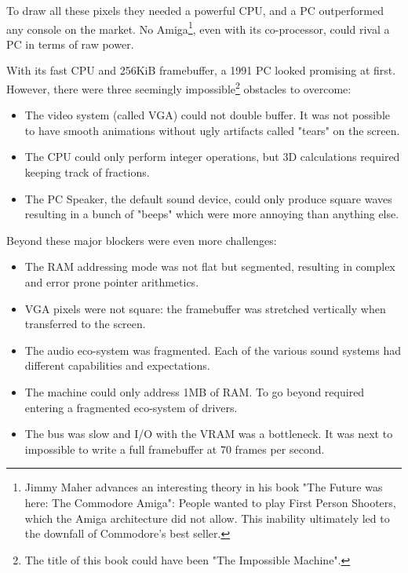 \par
To draw all these pixels they needed a powerful CPU, and a PC outperformed any console on the market. No Amiga\footnote{Jimmy Maher advances an interesting theory in his book "The Future was here: The Commodore Amiga": People wanted to play First Person Shooters, which the Amiga architecture did not allow. This inability ultimately led to the downfall of Commodore's best seller.}, even with its co-processor, could rival a PC in terms of raw power.
\par


 
With its fast CPU and 256KiB framebuffer, a 1991 PC looked promising at first. However, there were three seemingly impossible\footnote{The title of this book could have been "The Impossible Machine".} obstacles to overcome:
\begin{itemize}
\item The video system (called VGA) could not double buffer. It was not possible to have smooth animations without ugly artifacts called "tears" on the screen.
\item The CPU could only perform integer operations, but 3D calculations required keeping track of fractions.
\item The PC Speaker, the default sound device, could only produce square waves resulting in a bunch of "beeps" which were more annoying than anything else.
\end{itemize}
Beyond these major blockers were even more challenges:
\begin{itemize}
\item The RAM addressing mode was not flat but segmented, resulting in complex and error prone pointer arithmetics.
\item VGA pixels were not square: the framebuffer was stretched vertically when
transferred to the screen.
\item The audio eco-system was fragmented. Each of the various sound systems had different capabilities and expectations.
\item The machine could only address 1MB of RAM. To go beyond required entering a fragmented eco-system of drivers.
\item The bus was slow and I/O with the VRAM was a bottleneck. It was next to impossible to write a full framebuffer at 70 frames per second.
\end{itemize}

